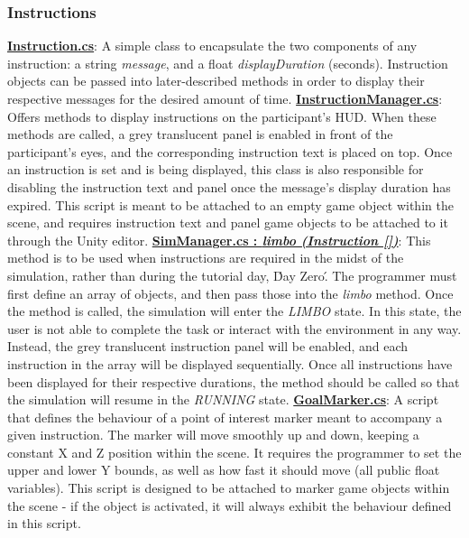 \documentclass{article}
\begin{document}
\subsubsection{Instructions} %
\href{https://bit.ly/2JFHEED}{\textbf{Instruction.cs}}: A simple class to encapsulate the two components of any instruction: a string \textit{message}, and a float \textit{displayDuration} (seconds). Instruction objects can be passed into later-described methods in order to display their respective messages for the desired amount of time. \newline \newline
\href{https://bit.ly/2TzLE9i}{\textbf{InstructionManager.cs}}: Offers methods to display instructions on the participant's HUD. When these methods are called, a grey translucent panel is enabled in front of the participant's eyes, and the corresponding instruction text is placed on top. Once an instruction is set and is being displayed, this class is also responsible for disabling the instruction text and panel once the message's display duration has expired. This script is meant to be attached to an empty game object within the scene, and requires instruction text and panel game objects to be attached to it through the Unity editor. \newline \newline
\href{https://bit.ly/2UhmSzq}{\textbf{SimManager.cs : \textit{limbo (Instruction [])}}}: This method is to be used when instructions are required in the midst of the simulation, rather than during the tutorial day, \'Day Zero\'. The programmer must first define an array of  objects, and then pass those into the \textit{limbo} method. Once the method is called, the simulation will enter the \textit{LIMBO} state. In this state, the user is not able to complete the task or interact with the environment in any way. Instead, the grey translucent instruction panel will be enabled, and each instruction in the array will be displayed sequentially. Once all instructions have been displayed for their respective durations, the  method should be called so that the simulation will resume in the \textit{RUNNING} state. \newline \newline
\href{https://bit.ly/2Yooc2m}{\textbf{GoalMarker.cs}}: A script that defines the behaviour of a point of interest marker meant to accompany a given instruction. The marker will move smoothly up and down, keeping a constant X and Z position within the scene. It requires the programmer to set the upper and lower Y bounds, as well as how fast it should move (all public float variables). This script is designed to be attached to marker game objects within the scene - if the object is activated, it will always exhibit the behaviour defined in this script. \newline \newline
\end{document}
